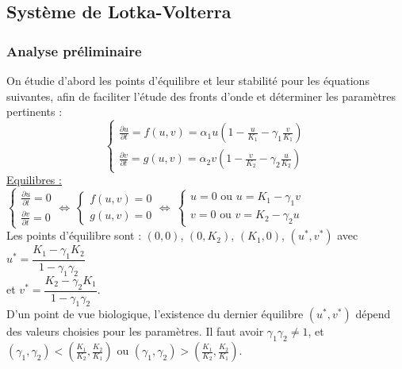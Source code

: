 \documentclass[a4paper,11pt]{article}
\begin{document}
\subsection{Système de Lotka-Volterra}
\subsubsection{Analyse préliminaire}
On étudie d'abord les points d'équilibre et leur stabilité pour les équations suivantes, afin de faciliter l'étude des fronts d'onde et déterminer les paramètres pertinents :
$$\begin{cases}
\frac{\partial u}{\partial t} = f(u,v) = \alpha_1 u\left(1-\frac{u}{K_1}-\gamma_1\frac{v}{K_1}\right)\\
\frac{\partial v}{\partial t} = g(u,v) = \alpha_2 v\left(1 - \frac{v}{K_2} - \gamma_2\frac{u}{K_2}\right)
\end{cases}$$
\noindent \underline{Equilibres :}\\

$\begin{cases}
\frac{\partial u}{\partial t} = 0\\
\frac{\partial v}{\partial t} = 0
\end{cases} \Leftrightarrow \
\begin{cases}
f(u,v)=0\\
g(u,v)=0
\end{cases} \Leftrightarrow \
\begin{cases}
u = 0 \text{ ou } u = K_1 - \gamma_1 v\\
v = 0 \text{ ou } v = K_2 - \gamma_2 u
\end{cases}$\\

\noindent Les points d'équilibre sont : $(0,0)$, $(0,K_2)$, $(K_1,0)$, $(u^*,v^*)$ avec 
$u^* = \dfrac{K_1 - \gamma_1 K_2}{1-\gamma_1 \gamma_2}$ \\
et $v^* = \dfrac{K_2 - \gamma_2 K_1}{1-\gamma_1 \gamma_2}$.\\ 

D'un point de vue biologique, l'existence du dernier équilibre $(u^*,v^*)$ dépend des valeurs choisies pour les paramètres. Il faut avoir $\gamma_1\gamma_2 \neq 1$, et $(\gamma_1,\gamma_2) < \left(\frac{K_1}{K_2},\frac{K_2}{K_1}\right)$ 
ou $(\gamma_1,\gamma_2) > \left(\frac{K_1}{K_2},\frac{K_2}{K_1}\right)$.\\
\end{document}

